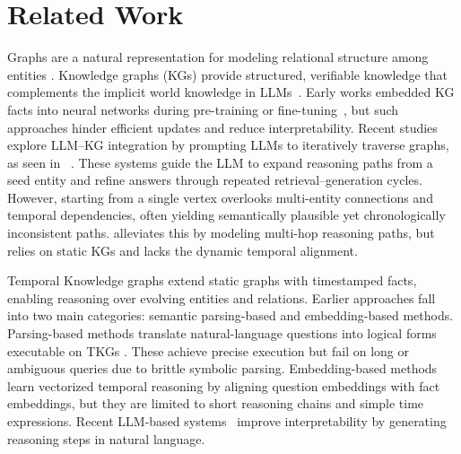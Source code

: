 

\section{Related Work}
\label{sec:related_work}
Graphs are a natural representation for modeling relational structure among entities \cite{li2024adarisk,li2025efficient,wang2025time, wang2025effective, wang2024efficient,wang2024simpler,wang2023towards, tan2023higher, zhai2025sgpt, zhai2025graph}.
Knowledge graphs (KGs) provide structured, verifiable knowledge that complements the implicit world knowledge in LLMs~\cite{pan2024unifying, guan2024mitigating, wu2023holistic,yanpingwu, xie2025hl}. 
Early works embedded KG facts into neural networks during pre-training or fine-tuning~\cite{zhang2021poolingformer,rogluo2023reasoning,sima2025deep,sima2026beyond, zheng2024understanding}, 
but such approaches hinder efficient updates and reduce interpretability. 
Recent studies explore LLM–KG integration by prompting LLMs to iteratively traverse graphs, as seen in  ~\cite{tog1.0sun2023think,jiang2023structgpt, tan2026privgemo, zai2025proh}.
These systems guide the LLM to expand reasoning paths from a seed entity and refine answers through repeated retrieval–generation cycles. 
However, starting from a single vertex overlooks multi-entity connections and temporal dependencies, 
often yielding semantically plausible yet chronologically inconsistent paths.  
\cite{pogtan2025paths} alleviates this by modeling multi-hop reasoning paths, 
but relies on static KGs and lacks the dynamic temporal alignment.

Temporal Knowledge graphs extend static graphs with timestamped facts, enabling reasoning over evolving entities and relations\cite{zhang2024tatkc, zhang2024towards, yang2023hgmatch}.  
Earlier approaches fall into two main categories: semantic parsing-based and embedding-based methods.  
Parsing-based methods translate natural-language questions into logical forms executable on TKGs \cite{TEQUILA,SYGMA, Prog-TQA}.  
These achieve precise execution but fail on long or ambiguous queries due to brittle symbolic parsing.  
Embedding-based methods ~\cite{saxena2021question, mavromatis2022tempoqr, mavromatis2022tempoqr} learn vectorized temporal reasoning by aligning question embeddings with fact embeddings, but they are limited to short reasoning chains and simple time expressions.  
Recent LLM-based systems~\cite{jia2024faithful,gao2024two,T4} improve interpretability by generating reasoning steps in natural language.  


